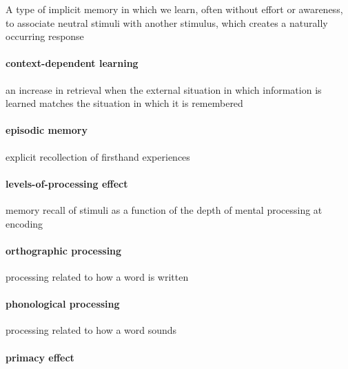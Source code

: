 \documentclass[
]{krantz}
\begin{document}
A type of implicit memory in which we learn, often without effort or awareness, to associate neutral stimuli with another stimulus, which creates a naturally occurring response

\paragraph*{context-dependent learning}\label{context-dependent-learning}

an increase in retrieval when the external situation in which information is learned matches the situation in which it is remembered

\paragraph*{episodic memory}\label{episodic-memory}

explicit recollection of firsthand experiences

\paragraph*{levels-of-processing effect}\label{levels-of-processing-effect}

memory recall of stimuli as a function of the depth of mental processing at encoding

\paragraph*{orthographic processing}\label{orthographic-processing}

processing related to how a word is written

\paragraph*{phonological processing}\label{phonological-processing}

processing related to how a word sounds

\paragraph*{primacy effect}\label{primacy-effect}
\end{document}
